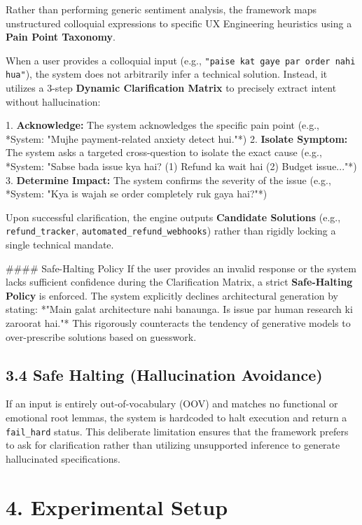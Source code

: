 \documentclass[11pt,a4paper]{article}
\begin{document}
Rather than performing generic sentiment analysis, the framework maps unstructured colloquial expressions to specific UX Engineering heuristics using a \textbf{Pain Point Taxonomy}. 

When a user provides a colloquial input (e.g., \texttt{"paise kat gaye par order nahi hua"}), the system does not arbitrarily infer a technical solution. Instead, it utilizes a 3-step \textbf{Dynamic Clarification Matrix} to precisely extract intent without hallucination:

1. \textbf{Acknowledge:} The system acknowledges the specific pain point (e.g., *System: "Mujhe payment-related anxiety detect hui."*)
2. \textbf{Isolate Symptom:} The system asks a targeted cross-question to isolate the exact cause (e.g., *System: "Sabse bada issue kya hai? (1) Refund ka wait hai (2) Budget issue..."*)
3. \textbf{Determine Impact:} The system confirms the severity of the issue (e.g., *System: "Kya is wajah se order completely ruk gaya hai?"*)

Upon successful clarification, the engine outputs \textbf{Candidate Solutions} (e.g., \texttt{refund_tracker}, \texttt{automated_refund_webhooks}) rather than rigidly locking a single technical mandate.

#### Safe-Halting Policy
If the user provides an invalid response or the system lacks sufficient confidence during the Clarification Matrix, a strict \textbf{Safe-Halting Policy} is enforced. The system explicitly declines architectural generation by stating: *"Main galat architecture nahi banaunga. Is issue par human research ki zaroorat hai."* This rigorously counteracts the tendency of generative models to over-prescribe solutions based on guesswork.

\subsection{3.4 Safe Halting (Hallucination Avoidance)}
If an input is entirely out-of-vocabulary (OOV) and matches no functional or emotional root lemmas, the system is hardcoded to halt execution and return a \texttt{fail_hard} status. This deliberate limitation ensures that the framework prefers to ask for clarification rather than utilizing unsupported inference to generate hallucinated specifications.



\section{4. Experimental Setup}
\end{document}
